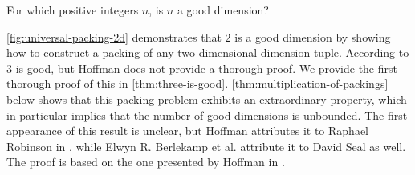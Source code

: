 \begin{question}
For which positive integers $n$, is $n$ a good dimension?
\end{question}

\noindent \cref{fig:universal-packing-2d} demonstrates that $2$ is a good dimension by showing how to construct a packing of any two-dimensional dimension tuple. According to \cite[p. 215]{Hoffman1981} $3$ is good, but Hoffman does not provide a thorough proof. We provide the first thorough proof of this in \cref{thm:three-is-good}. \cref{thm:multiplication-of-packings} below shows that this packing problem exhibits an extraordinary property, which in particular implies that the number of good dimensions is unbounded. The first appearance of this result is unclear, but Hoffman attributes it to Raphael Robinson in \cite[p. 223]{Hoffman1981}, while Elwyn R. Berlekamp et al. \cite[p. 914]{berlekamp_conway_guy_2004} attribute it to David Seal as well. The proof is based on the one presented by Hoffman in \cite[p. 223--225]{Hoffman1981}.

